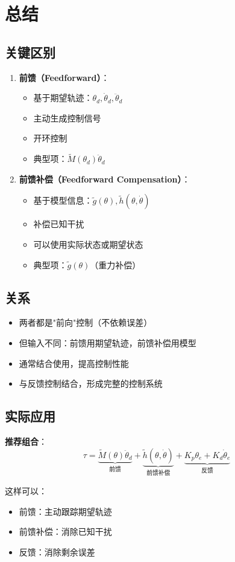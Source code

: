 \documentclass[12pt,a4paper]{article}
\begin{document}
\section{总结}

\subsection{关键区别}

\begin{enumerate}
\item \textbf{前馈（Feedforward）}：
\begin{itemize}
\item 基于期望轨迹：$\theta_d, \dot{\theta}_d, \ddot{\theta}_d$
\item 主动生成控制信号
\item 开环控制
\item 典型项：$\tilde{M}(\theta_d)\ddot{\theta}_d$
\end{itemize}

\item \textbf{前馈补偿（Feedforward Compensation）}：
\begin{itemize}
\item 基于模型信息：$\tilde{g}(\theta), \tilde{h}(\theta, \dot{\theta})$
\item 补偿已知干扰
\item 可以使用实际状态或期望状态
\item 典型项：$\tilde{g}(\theta)$（重力补偿）
\end{itemize}
\end{enumerate}

\subsection{关系}

\begin{itemize}
\item 两者都是"前向"控制（不依赖误差）
\item 但输入不同：前馈用期望轨迹，前馈补偿用模型
\item 通常结合使用，提高控制性能
\item 与反馈控制结合，形成完整的控制系统
\end{itemize}

\subsection{实际应用}

\textbf{推荐组合}：
\begin{equation}
\tau = \underbrace{\tilde{M}(\theta)\ddot{\theta}_d}_{\text{前馈}} + \underbrace{\tilde{h}(\theta, \dot{\theta})}_{\text{前馈补偿}} + \underbrace{K_p\theta_e + K_d\dot{\theta}_e}_{\text{反馈}}
\end{equation}

这样可以：
\begin{itemize}
\item 前馈：主动跟踪期望轨迹
\item 前馈补偿：消除已知干扰
\item 反馈：消除剩余误差
\end{itemize}
\end{document}

